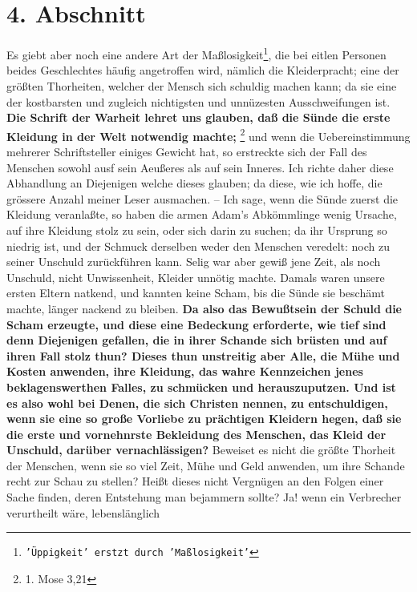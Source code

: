\section{4. Abschnitt} \label{kap14_ab4}

Es giebt aber noch eine andere Art der Maßlosigkeit\footnote{\texttt{'Üppigkeit' erstzt durch 'Maßlosigkeit'}}, die bei eitlen Personen beides
Geschlechtes häufig angetroffen wird, nämlich die Kleiderpracht; eine der
größten Thorheiten, welcher der Mensch sich schuldig machen kann; da sie eine
der kostbarsten und zugleich nichtigsten und unnüzesten Ausschweifungen ist. \textbf{Die
Schrift der Warheit lehret uns glauben, daß die Sünde die erste Kleidung in der
Welt notwendig machte;}
\footnote{1. Mose 3,21}
und wenn die Uebereinstimmung
mehrerer Schriftsteller einiges Gewicht hat, so erstreckte sich der Fall des
Menschen sowohl ausf sein Aeußeres als auf sein Inneres. Ich richte daher diese
Abhandlung an Diejenigen welche dieses glauben; da diese, wie ich hoffe, die
grössere Anzahl meiner Leser ausmachen. -- Ich sage, wenn die Sünde zuerst die
Kleidung veranlaßte, so haben die armen Adam’s Abkömmlinge wenig Ursache, auf
ihre Kleidung stolz zu sein, oder sich darin zu suchen; da ihr Ursprung so
niedrig ist, und der Schmuck derselben weder den Menschen veredelt: noch zu
seiner Unschuld zurückführen kann. Selig war aber gewiß jene Zeit, als noch
Unschuld, nicht Unwissenheit, Kleider unnötig machte. Damals waren unsere ersten
Eltern natkend, und kannten keine Scham, bis die Sünde sie beschämt machte,
länger nackend zu bleiben. \label{ref:14_04_wahre_nachfolger_kleidung}
\textbf{Da also das Bewußtsein der Schuld die Scham erzeugte,
und diese eine Bedeckung erforderte, wie tief sind denn Diejenigen gefallen, die
in ihrer Schande sich brüsten und auf ihren Fall stolz thun? Dieses thun
unstreitig aber Alle, die Mühe und Kosten anwenden, ihre Kleidung, das wahre
Kennzeichen jenes beklagenswerthen Falles, zu schmücken und herauszuputzen. Und
ist es also wohl bei Denen, die sich Christen nennen, zu entschuldigen, wenn sie
eine so große Vorliebe zu prächtigen Kleidern hegen, daß sie die erste und
vornehnrste Bekleidung des Menschen, das Kleid der Unschuld, darüber
vernachlässigen?} Beweiset es nicht die größte Thorheit der Menschen, wenn sie so
viel Zeit, Mühe und Geld anwenden, um ihre Schande recht zur Schau zu stellen?
Heißt dieses nicht Vergnügen an den Folgen einer Sache finden, deren Entstehung
man bejammern sollte? Ja! wenn ein Verbrecher verurtheilt wäre, lebenslänglich
